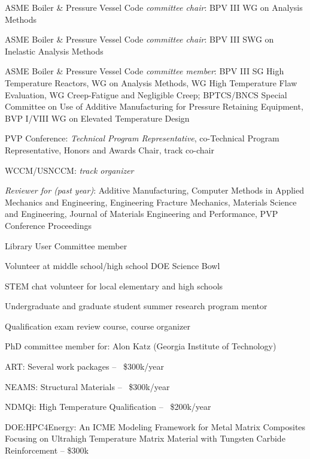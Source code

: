 ASME Boiler \& Pressure Vessel Code \emph{committee chair}:  BPV III WG on Analysis Methods

ASME Boiler \& Pressure Vessel Code \emph{committee chair}:  BPV III SWG on Inelastic Analysis Methods 

ASME Boiler \& Pressure Vessel Code \emph{committee member}:  BPV III SG High Temperature Reactors,
WG on Analysis Methods, WG High Temperature Flaw Evaluation, 
WG Creep-Fatigue and Negligible Creep; BPTCS/BNCS Special Committee on 
Use of Additive Manufacturing for Pressure Retaining Equipment, BVP I/VIII WG on Elevated Temperature Design

PVP Conference:  \emph{Technical Program Representative}, co-Technical Program Representative, Honors and Awards Chair, track co-chair

WCCM/USNCCM:  \emph{track organizer} 

\emph{Reviewer for (past year)}:   
Additive Manufacturing,
Computer Methods in Applied Mechanics and Engineering,
Engineering Fracture Mechanics,
Materials Science and Engineering,
Journal of Materials Engineering and Performance,
PVP Conference Proceedings


Library User Committee member 

Volunteer at middle school/high school DOE Science Bowl 

STEM chat volunteer for local elementary and high schools 

Undergraduate and graduate student summer research program mentor 

Qualification exam review course, course organizer 

PhD committee member for: Alon Katz (Georgia Institute of Technology)


ART: Several work packages -- ~\$300k/year 

NEAMS: Structural Materials -- ~\$300k/year 

NDMQi: High Temperature Qualification -- ~\$200k/year 


DOE:HPC4Energy: An ICME Modeling Framework for Metal Matrix Composites Focusing on Ultrahigh Temperature Matrix Material with Tungsten Carbide Reinforcement -- \$300k 

